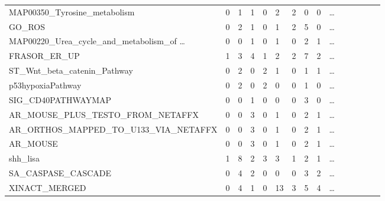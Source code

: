 \documentclass{scrartcl}
\numberwithin{figure}{section}
\numberwithin{table}{section}
\begin{document}
\begin{table}[h!]
\begin{tabular}{lllllllllllllll}
MAP00350\_Tyrosine\_metabolism                   & 0            & 1           & 1               & 0          & 2            & 2            & 0            & 0 & \dots \\
GO\_ROS                                          & 0            & 2           & 1               & 0          & 1            & 2            & 5            & 0 & \dots \\
MAP00220\_Urea\_cycle\_and\_metabolism\_of \dots & 0            & 0           & 1               & 0          & 1            & 0            & 2            & 1 & \dots \\
FRASOR\_ER\_UP                                   & 1            & 3           & 4               & 1          & 2            & 2            & 7            & 2 & \dots \\
ST\_Wnt\_beta\_catenin\_Pathway                  & 0            & 2           & 0               & 2          & 1            & 0            & 1            & 1 & \dots \\
p53hypoxiaPathway                                & 0            & 2           & 0               & 2          & 0            & 0            & 1            & 0 & \dots \\
SIG\_CD40PATHWAYMAP                              & 0            & 0           & 1               & 0          & 0            & 0            & 3            & 0 & \dots \\
AR\_MOUSE\_PLUS\_TESTO\_FROM\_NETAFFX            & 0            & 0           & 3               & 0          & 1            & 0            & 2            & 1 & \dots \\
AR\_ORTHOS\_MAPPED\_TO\_U133\_VIA\_NETAFFX       & 0            & 0           & 3               & 0          & 1            & 0            & 2            & 1 & \dots \\
AR\_MOUSE                                        & 0            & 0           & 3               & 0          & 1            & 0            & 2            & 1 & \dots \\
shh\_lisa                                        & 1            & 8           & 2               & 3          & 3            & 1            & 2            & 1 & \dots \\
SA\_CASPASE\_CASCADE                             & 0            & 4           & 2               & 0          & 0            & 0            & 3            & 2 & \dots \\
XINACT\_MERGED                                   & 0            & 4           & 1               & 0          & 13           & 3            & 5            & 4 & \dots \\

\end{tabular}
\end{table}
\end{document}
